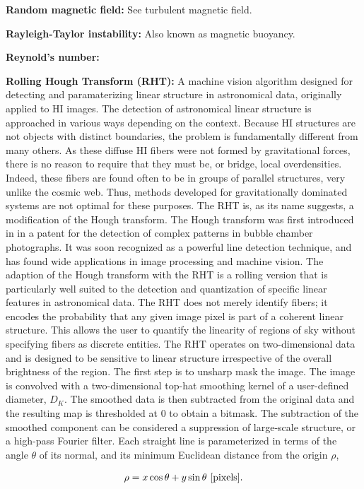\documentclass[a4paper,11pt]{article}
\begin{document}
{\noindent}\textbf{Random magnetic field:} See turbulent magnetic field.

{\noindent}\textbf{Rayleigh-Taylor instability:} Also known as magnetic buoyancy.

{\noindent}\textbf{Reynold's number:}

{\noindent}\textbf{Rolling Hough Transform (RHT):} A machine vision algorithm designed for detecting and paramaterizing linear structure in astronomical data, originally applied to HI images. The detection of astronomical linear structure is approached in various ways depending on the context. Because HI structures are not objects with distinct boundaries, the problem is fundamentally different from many others. As these diffuse HI fibers were not formed by gravitational forces, there is no reason to require that they must be, or bridge, local overdensities. Indeed, these fibers are found often to be in groups of parallel structures, very unlike the cosmic web. Thus, methods developed for gravitationally dominated systems are not optimal for these purposes. The RHT is, as its name suggests, a modification of the Hough transform. The Hough transform was first introduced in in a patent for the detection of complex patterns in bubble chamber photographs. It was soon recognized as a powerful line detection technique, and has found wide applications in image processing and machine vision. The adaption of the Hough transform with the RHT is a rolling version that is particularly well suited to the detection and quantization of specific linear features in astronomical data. The RHT does not merely identify fibers; it encodes the probability that any given image pixel is part of a coherent linear structure. This allows the user to quantify the linearity of regions of sky without specifying fibers as discrete entities. The RHT operates on two-dimensional data and is designed to be sensitive to linear structure irrespective of the overall brightness of the region. The first step is to unsharp mask the image. The image is convolved with a two-dimensional top-hat smoothing kernel of a user-defined diameter, $D_K$. The smoothed data is then subtracted from the original data  and the resulting map is thresholded at 0 to obtain a bitmask. The subtraction of the smoothed component can be considered a suppression of large-scale structure, or a high-pass Fourier filter. Each straight line is parameterized in terms of the angle $\theta$ of its normal, and its minimum Euclidean distance from the origin $\rho$,

\begin{align*}
    \rho = x\cos\theta+y\sin\theta ~ [{\rm pixels}].
\end{align*}
\end{document}

